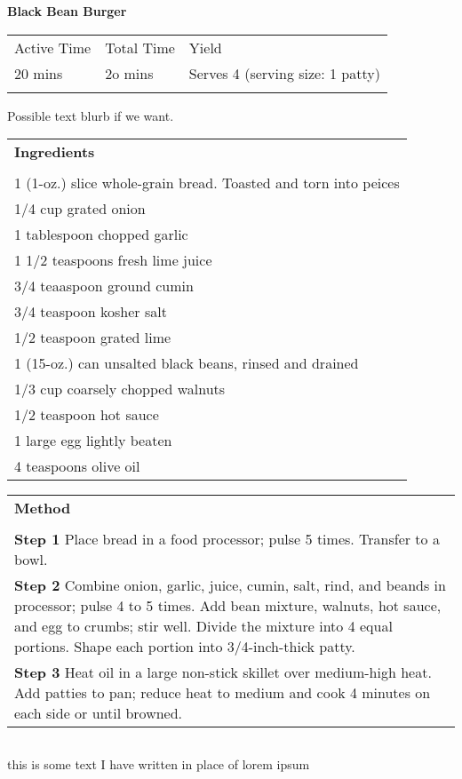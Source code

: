 \documentclass[11pt]{article}
\begin{document}
{\Huge \textbf{Black Bean Burger}\par}
\vspace{1em}
\begin{tabular}{@{}l l l}
  \hline
  \noalign{\smallskip}
  Active Time & Total Time & Yield \\
  20 mins & 2o mins & Serves 4 (serving size: 1 patty) \\
  \noalign{\smallskip}
  \hline
\end{tabular}

\vspace{2em}
Possible text blurb if we want.
\vspace{2em}

\begin{tabular}[t]{ p{5cm} }
  \textbf{Ingredients} \\
  \\
  1 (1-oz.) slice whole-grain bread. Toasted and torn into peices \\
  1/4 cup grated onion \\
  1 tablespoon chopped garlic \\
  1 1/2 teaspoons fresh lime juice \\
  3/4 teaaspoon ground cumin \\
  3/4 teaspoon kosher salt \\
  1/2 teaspoon grated lime \\
  1 (15-oz.) can unsalted black beans, rinsed and drained \\
  1/3 cup coarsely chopped walnuts \\
  1/2 teaspoon hot sauce \\
  1 large egg lightly beaten \\
  4 teaspoons olive oil \\
\end{tabular}
\begin{tabular}[t]{ p{10cm} }
  \textbf{Method} \\
  \\
  \textbf{Step 1} \hspace{3mm} Place bread in a food processor; pulse 5 times. Transfer to a bowl. \\[5mm]
  \textbf{Step 2} \hspace{3mm} Combine onion, garlic, juice, cumin, salt, rind, and beands in processor; pulse 4 to 5 times. Add bean mixture, walnuts, hot sauce, and egg to crumbs; stir well. Divide the mixture into 4 equal portions. Shape each portion into 3/4-inch-thick patty. \\[5mm]
  \textbf{Step 3} \hspace{3mm} Heat oil in a large non-stick skillet over medium-high heat. Add patties to pan; reduce heat to medium and cook 4 minutes on each side or until browned. \\
\end{tabular}

\vspace{3em}
\begin{tabular}[b]{ p{3cm} }
  \hline
\end{tabular}
this is some text I have written in place of lorem ipsum
\end{document}

